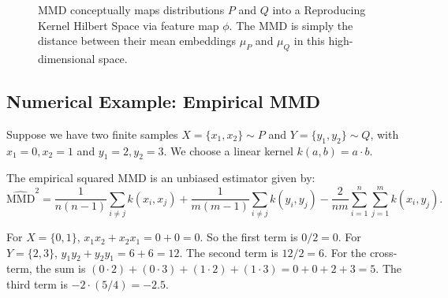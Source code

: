 \begin{figure}[htbp]
\centering
{}
\caption{MMD conceptually maps distributions $P$ and $Q$ into a Reproducing Kernel Hilbert Space via feature map $\phi$. The MMD is simply the distance between their mean embeddings $\mu_P$ and $\mu_Q$ in this high-dimensional space.}
\label{fig:mmd_rkhs}
\end{figure}

\subsection{Numerical Example: Empirical MMD}

Suppose we have two finite samples $X = \{x_1, x_2\} \sim P$ and $Y = \{y_1, y_2\} \sim Q$, with $x_1 = 0, x_2 = 1$ and $y_1 = 2, y_2 = 3$.
We choose a linear kernel $k(a, b) = a \cdot b$.

The empirical squared MMD is an unbiased estimator given by:
\begin{equation}
    \widehat{\text{MMD}}^2 = \frac{1}{n(n-1)} \sum_{i \neq j} k(x_i, x_j) + \frac{1}{m(m-1)} \sum_{i \neq j} k(y_i, y_j) - \frac{2}{nm} \sum_{i=1}^n \sum_{j=1}^m k(x_i, y_j).
\end{equation}

For $X = \{0, 1\}$, $x_1 x_2 + x_2 x_1 = 0 + 0 = 0$. So the first term is $0 / 2 = 0$.
For $Y = \{2, 3\}$, $y_1 y_2 + y_2 y_1 = 6 + 6 = 12$. The second term is $12 / 2 = 6$.
For the cross-term, the sum is $(0 \cdot 2) + (0 \cdot 3) + (1 \cdot 2) + (1 \cdot 3) = 0 + 0 + 2 + 3 = 5$. The third term is $-2 \cdot (5 / 4) = -2.5$.

